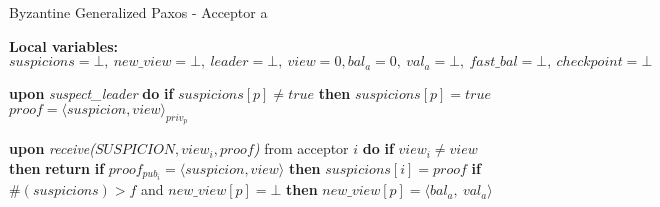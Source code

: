 \begin{algorithm} 
	\caption{Byzantine Generalized Paxos - Acceptor a}
	\label{BFT-Proc}
	\textbf{Local variables:} $suspicions = \bot,\ new\_view = \bot,\ leader = \bot,\ view = 0, bal_a = 0,\ val_a = \bot,\ fast\_bal = \bot,\ checkpoint=\bot$
	\begin{algorithmic}[1]
		
		\State \textbf{upon} \textit{suspect\_leader} \textbf{do} 
		\State \hspace{\algorithmicindent} \textbf{if} $suspicions[p] \neq true$ \textbf{then}
		\State\hspace{\algorithmicindent}\hspace{\algorithmicindent} $suspicions[p] = true$
		\State\hspace{\algorithmicindent}\hspace{\algorithmicindent} $proof = \langle suspicion, view \rangle_{priv_p}$
		\State\hspace{\algorithmicindent}\hspace{\algorithmicindent} 
		\State
		
		\State \textbf{upon} \textit{receive($SUSPICION, view_i, proof$)} from acceptor $i$ \textbf{do} 
		\State \hspace{\algorithmicindent} \textbf{if} $view_i \neq view$ \textbf{then}
		\State \hspace{\algorithmicindent}\hspace{\algorithmicindent} \textbf{return}
		\State
		\State\hspace{\algorithmicindent} \textbf{if} $proof_{pub_i} = \langle suspicion, view \rangle$ \textbf{then}
		\State\hspace{\algorithmicindent}\hspace{\algorithmicindent} $suspicions[i] = proof$
		\State
		\State\hspace{\algorithmicindent} \textbf{if} $\#(suspicions) > f$ and $new\_view[p] = \bot$ \textbf{then}
		\State\hspace{\algorithmicindent}\hspace{\algorithmicindent} $new\_view[p] = \langle bal_a,\ val_a \rangle$
		\State\hspace{\algorithmicindent}\hspace{\algorithmicindent} 
		\State
		

\end{algorithmic}
\end{algorithm}
